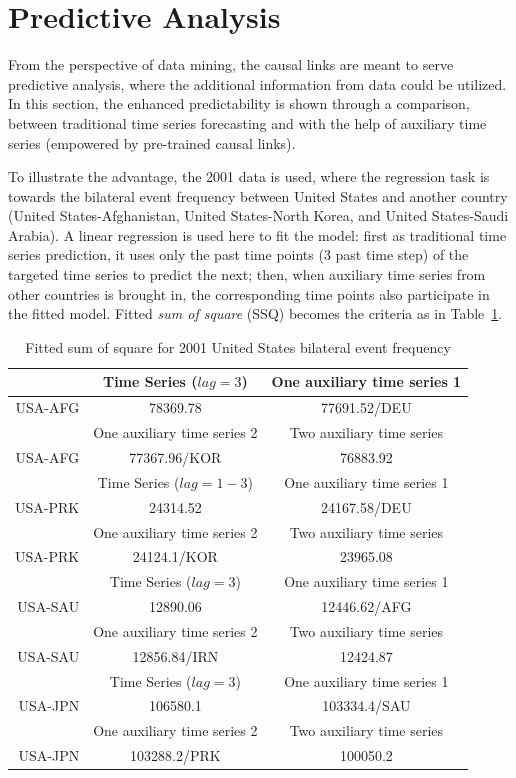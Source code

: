 \documentclass[runningheads,a4paper]{llncs}
\begin{document}
\section{ Predictive Analysis}
\label{results}
From the perspective of data mining, the causal links are meant to serve predictive analysis, where the additional information from data could be utilized. In this section, the enhanced predictability is shown through a comparison, between traditional time series forecasting and with the help of auxiliary time series (empowered by pre-trained causal links). 

To illustrate the advantage, the 2001 data is used, where the regression task is towards the bilateral event frequency between United States and another country (United States-Afghanistan, United States-North Korea, and United States-Saudi Arabia). A linear regression is used here to fit the model: first as traditional time series prediction, it uses only the past time points (3 past time step) of the targeted time series to predict the next; then, when auxiliary time series from other countries is brought in, the corresponding time points also participate in the fitted model. Fitted {\em sum of square} (SSQ) becomes the criteria as in Table~\ref{tab:4}. 

\begin{table}
\caption{Fitted sum of square for 2001 United States bilateral event frequency}
\centering
\begin{tabular}{r c c}
\hline\hline
{ } &  Time Series ($lag=3$) &  One auxiliary time series 1  \\
\hline
USA-AFG  & 78369.78 &  77691.52/DEU \\
\hline
{}  & One auxiliary time series 2 & Two auxiliary time series \\
\hline
USA-AFG &  77367.96/KOR  & 76883.92 \\
\hline
{ } &  Time Series ($lag=1-3$) &  One auxiliary time series 1  \\
\hline
USA-PRK  & 24314.52  & 24167.58/DEU  \\
\hline
{}  & One auxiliary time series 2 & Two auxiliary time series \\
\hline
USA-PRK  & 24124.1/KOR  &  23965.08\\
\hline
{ } &  Time Series ($lag=3$) &  One auxiliary time series 1  \\
\hline
USA-SAU  &  12890.06  &  12446.62/AFG \\
\hline
{}  & One auxiliary time series 2 & Two auxiliary time series \\
\hline
USA-SAU   &  12856.84/IRN  &  12424.87 \\
\hline
{ } &  Time Series ($lag=3$) &  One auxiliary time series 1  \\
\hline
USA-JPN  &  106580.1  & 103334.4/SAU \\
\hline
{}  & One auxiliary time series 2 & Two auxiliary time series \\
\hline
USA-JPN &  103288.2/PRK  & 100050.2 \\
\hline\hline
\end{tabular}
\label{tab:4}
\end{table}
\end{document}
